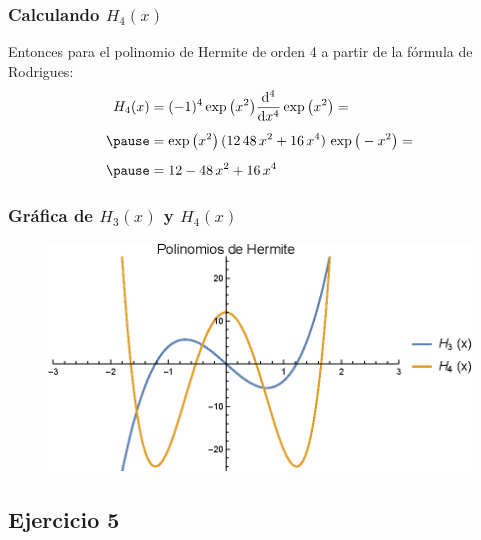 \documentclass[12pt]{beamer}
\begin{document}
\begin{frame}
\frametitle{Calculando $H_{4} (x)$}
Entonces para el polinomio de Hermite de orden 4 a partir de la fórmula de Rodrigues:
\pause
\begin{eqnarray*}
\begin{aligned}
H_{4} (x) &= (-1)^{4} \exp\big( x^{2} \big) \dv[4]{x} \exp\big( x^{2} \big) = \\[0.5em] \pause
&= \exp\big( x^{2} \big) \, (12 \, 48 \, x^{2} + 16 \, x^{4}) \, \exp\big( - x^{2} \big) = \\[0.5em] \pause
&= 12 - 48 \, x^{2} + 16 \, x^{4}
\end{aligned}
\end{eqnarray*}
\end{frame}
\begin{frame}
\frametitle{Gráfica de $H_{3} (x)$ y $H_{4} (x)$}
\begin{figure}
  \centering
  \includegraphics[scale=0.95]{Imagenes/Plot_Hermite_H3_H4.eps}
\end{figure}
\end{frame}

\subsection{Ejercicio 5}
\end{document}
